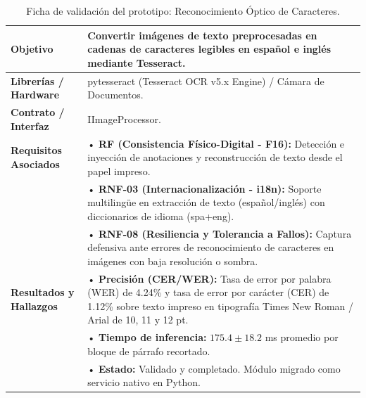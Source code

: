 \begin{table}[H]
    \centering
    \caption{Ficha de validación del prototipo: Reconocimiento Óptico de Caracteres.}
    \label{tab:ficha_f3}
    \begin{tabular}{|L{3.2cm}|L{11.0cm}|}
        \hline
        \textbf{Objetivo} & Convertir imágenes de texto preprocesadas en cadenas de caracteres legibles en español e inglés mediante Tesseract. \\ \hline
        \textbf{Librerías / Hardware} & pytesseract (Tesseract OCR v5.x Engine) / Cámara de Documentos. \\ \hline
        \textbf{Contrato / Interfaz} & IImageProcessor. \\ \hline
        \textbf{Requisitos Asociados} &
        • \textbf{RF (Consistencia Físico-Digital - F16):} Detección e inyección de anotaciones y reconstrucción de texto desde el papel impreso. \vspace{0.1cm} \\
        & • \textbf{RNF-03 (Internacionalización - i18n):} Soporte multilingüe en extracción de texto (español/inglés) con diccionarios de idioma (spa+eng). \vspace{0.1cm} \\
        & • \textbf{RNF-08 (Resiliencia y Tolerancia a Fallos):} Captura defensiva ante errores de reconocimiento de caracteres en imágenes con baja resolución o sombra. \\ \hline
        \textbf{Resultados y Hallazgos} &
        • \textbf{Precisión (CER/WER):} Tasa de error por palabra (WER) de 4.24\% y tasa de error por carácter (CER) de 1.12\% sobre texto impreso en tipografía Times New Roman / Arial de 10, 11 y 12 pt. \vspace{0.1cm} \\
        & • \textbf{Tiempo de inferencia:} $175.4 \pm 18.2$ ms promedio por bloque de párrafo recortado. \vspace{0.1cm} \\
        & • \textbf{Estado:} Validado y completado. Módulo migrado como servicio nativo en Python. \\ \hline
    \end{tabular}
\end{table}
 
